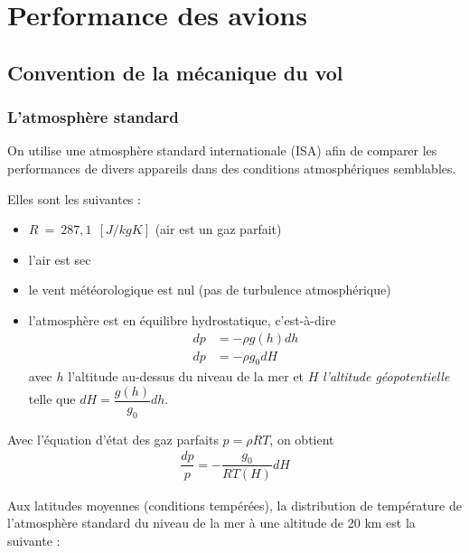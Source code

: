 \documentclass{report}
\begin{document}
\pagestyle{fancy} 
\renewcommand{\footrulewidth}{1pt}

\renewcommand{\thesection}{\arabic{section}}
\renewcommand{\partname}{}
\renewcommand{\labelitemii}{$\bullet$}
\graphicspath{{img/}}




\newpage


\chapter{Performance des avions}

\section{Convention de la mécanique du vol}
\subsection{L'atmosphère standard}

On utilise une atmosphère standard internationale (ISA) afin de comparer les performances de divers appareils dans des conditions atmosphériques semblables.

Elles sont les suivantes :
\begin{itemize}
    \item $R ~=~ 287,1~~[J/kgK]$ (air est un gaz parfait)
    \item l'air est sec
    \item le vent météorologique est nul (pas de turbulence atmosphérique)
    \item l’atmosphère est en équilibre hydrostatique, c’est-à-dire\\
    \begin{eqnarray}
    dp&=-\rho g(h) dh\\
    dp&=-\rho g_0 dH
    \end{eqnarray}
    avec $h$ l'altitude au-dessus du niveau de la mer et $H$ \textit{l'altitude géopotentielle} telle que $dH=\dfrac{g(h)}{g_0}dh$.
\end{itemize}

Avec l'équation d'état des gaz parfaits $p=\rho RT$, on obtient
\begin{eqnarray}
\dfrac{dp}{p}=-\dfrac{g_0}{RT(H)}dH
\end{eqnarray}

Aux latitudes moyennes (conditions tempérées), la distribution de température de l’atmosphère standard du niveau de la mer à une altitude de 20 km est la suivante :
\end{document}
